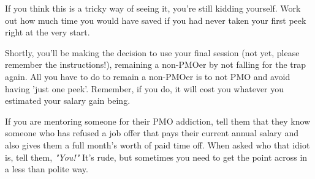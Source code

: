 \documentclass[easypeasy.tex]{subfiles}
\begin{document}
If you think this is a tricky way of seeing it, you're still kidding yourself. Work out how much time you would have saved if you had never taken your first peek right at the very start.

Shortly, you'll be making the decision to use your final session (not yet, please remember the instructions!), remaining a non-PMOer by not falling for the trap again. All you have to do to remain a non-PMOer is to not PMO and avoid having 'just one peek'. Remember, if you do, it will cost you whatever you estimated your salary gain being.

If you are mentoring someone for their PMO addiction, tell them that they know someone who has refused a job offer that pays their current annual salary and also gives them a full month's worth of paid time off. When asked who that idiot is, tell them, \textit{"You!"} It's rude, but sometimes you need to get the point across in a less than polite way.
\end{document}
